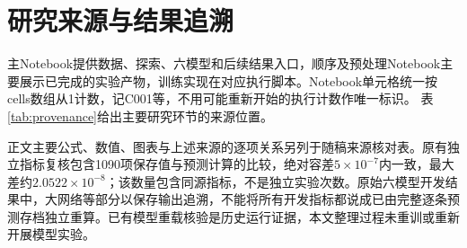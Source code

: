 \section{研究来源与结果追溯}\label{app:provenance}
主Notebook提供数据、探索、六模型和后续结果入口，顺序及预处理Notebook主要展示已完成的实验产物，训练实现在对应执行脚本。Notebook单元格统一按cells数组从1计数，记C001等，不用可能重新开始的执行计数作唯一标识。
表\ref{tab:provenance}给出主要研究环节的来源位置。


正文主要公式、数值、图表与上述来源的逐项关系另列于随稿来源核对表。原有独立指标复核包含1090项保存值与预测计算的比较，绝对容差$5\times10^{-7}$内一致，最大差约$2.0522\times10^{-8}$；该数量包含同源指标，不是独立实验次数。原始六模型开发结果中，大网络等部分以保存输出追溯，不能将所有开发指标都说成已由完整逐条预测存档独立重算。已有模型重载核验是历史运行证据，本文整理过程未重训或重新开展模型实验。
